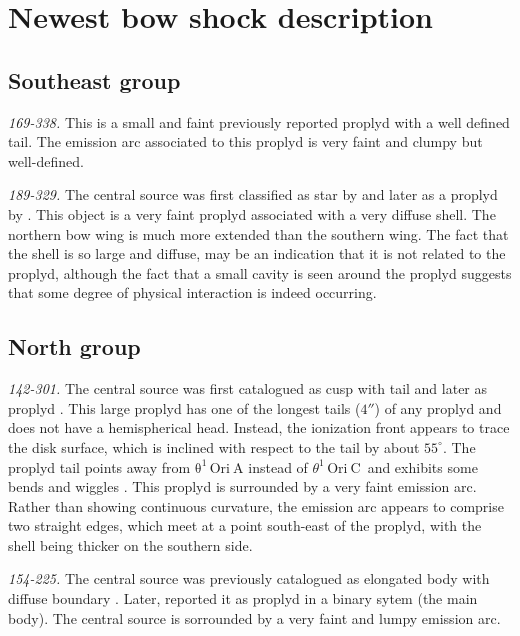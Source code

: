 \documentclass[iop, apj]{emulateapj}
\newcommand\thC{\ensuremath{\theta^1\,\mathrm{Ori~C}}}
\begin{document}
\section{Newest bow shock description}
\label{sec:description}

\subsection{Southeast group}
\label{sec:se-group}

\textit{169-338.} This is a small and faint previously reported proplyd \citep{ODell:1994a, Ricci:2008a} with a well defined tail. The emission arc associated to this proplyd is very faint and clumpy but well-defined. 

\textit{189-329.} The central source was first classified as star by \citet{ODell:1996a} and later as a proplyd by \citet{Ricci:2008a}. This object is a very faint proplyd associated with a very diffuse shell. The northern bow wing is much more extended than the southern wing. The fact that the shell is so large and diffuse, may be an indication that it is not related to the proplyd, although the fact that a small cavity is seen  around the proplyd suggests that some degree of physical interaction is indeed occurring.

\subsection{North group}
\label{sec:n-group}

\textit{142-301.} The central source was first catalogued as cusp with tail \citep{ODell:1996a} and later as proplyd \citep{Bally:2000a, Ricci:2008a}. This large proplyd has one of the longest tails (\(4''\)) of any proplyd and does not have a hemispherical head. Instead, the ionization front appears to trace the disk surface, which is inclined with respect to the tail by about $55^{\circ}$. The proplyd tail points away from \(\mathrm{\theta^1\,Ori~A}\) instead of \thC~and exhibits some bends and wiggles \citep{Bally:2000a}. This proplyd is surrounded by a very faint emission arc.  Rather than showing continuous curvature, the emission arc appears to comprise two straight edges, which meet at a point south-east of the proplyd, with the shell being thicker on the southern side.

\textit{154-225.} The central source was previously catalogued as elongated body with diffuse boundary \citep{ODell:1996a}. Later, \citet{Ricci:2008a} reported it as proplyd in a binary sytem (the main body). The central source is sorrounded by a very faint and lumpy emission arc.
\end{document}
